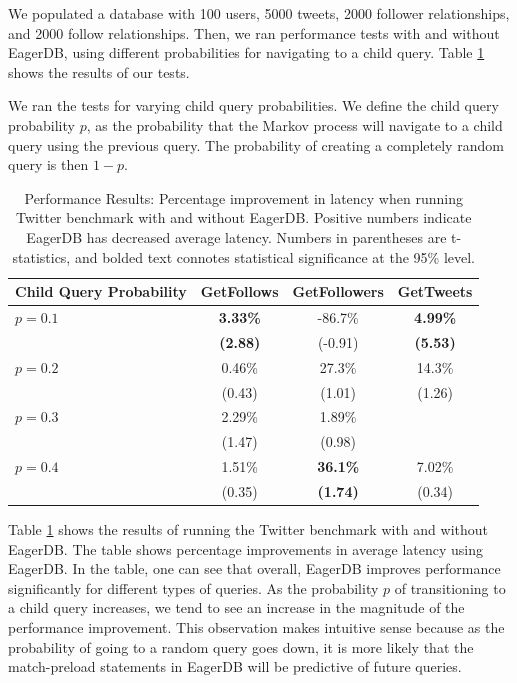 \documentclass[12pt]{article}
\begin{document}
We populated a database with 100 users, 5000 tweets, 2000 follower relationships, and 2000 follow relationships. Then, we ran performance tests with and without EagerDB, using different probabilities for navigating to a child query. Table \ref{fig:performance-results} shows the results of our tests.

We ran the tests for varying child query probabilities. We define the child query probability $p$, as the probability that the Markov process will navigate to a child query using the previous query. The probability of creating a completely random query is then $1-p$.

\begin{table}[h]
  \centering
  \begin{tabular}{l | c c c }
    Child Query Probability & GetFollows      & GetFollowers    & GetTweets \\
    \hline \hline
                  $p = 0.1$ & \textbf{3.33\%} & -86.7\%         & \textbf{4.99\%} \\
                            & \textbf{(2.88)} & (-0.91)         & \textbf{(5.53)} \\
                  $p = 0.2$ & 0.46\%          & 27.3\%          & 14.3\% \\
                            & (0.43)          & (1.01)          & (1.26) \\
                  $p = 0.3$ & 2.29\%          & 1.89\%          &        \\
                            & (1.47)          & (0.98)          &        \\
                  $p = 0.4$ & 1.51\%          & \textbf{36.1\%} & 7.02\% \\
                            & (0.35)          & \textbf{(1.74)} & (0.34)
  \end{tabular}
  \caption{\label{fig:performance-results}Performance Results: Percentage improvement in latency when running Twitter benchmark with and without EagerDB. Positive numbers indicate EagerDB has decreased average latency. Numbers in parentheses are t-statistics, and bolded text connotes statistical significance at the 95\% level.}
\end{table}

Table \ref{fig:performance-results} shows the results of running the Twitter benchmark with and without EagerDB. The table shows percentage improvements in average latency using EagerDB. In the table, one can see that overall, EagerDB improves performance significantly for different types of queries. As the probability $p$ of transitioning to a child query increases, we tend to see an increase in the magnitude of the performance improvement. This observation makes intuitive sense because as the probability of going to a random query goes down, it is more likely that the match-preload statements in EagerDB will be predictive of future queries.
\end{document}
